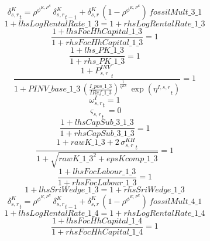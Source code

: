 \begin{dmath}
{{\delta^{K}_{s,r}}}_{t}={{\rho^{\phi^{K,P^E}}}}\, {{\delta^{K}_{s,r}}}_{t-1}+{{\delta^{K}_{s,r}}}\, \left(1-{{\rho^{\phi^{K,P^E}}}}\right)\, {fossilMult\_3\_1}
\end{dmath}
\begin{dmath}
1+{lhsLogRentalRate\_1\_3}=1+{rhsLogRentalRate\_1\_3}
\end{dmath}
\begin{dmath}
\frac{1+{lhsFocHhCapital\_1\_3}}{1+{rhsFocHhCapital\_1\_3}}=1
\end{dmath}
\begin{dmath}
\frac{1+{lhs\_PK\_1\_3}}{1+{rhs\_PK\_1\_3}}=1
\end{dmath}
\begin{dmath}
\frac{1+{{P^{INV}_{s,r}}}_{t}}{1+{PINV\_base\_1\_3}\, \left(\frac{{I\_pos\_1\_3}}{{IRef\_1\_3}}\right)^{\frac{1}{{{\eta^{KS}}}}}\, \exp\left({{\eta^{I,s,r}}}_{t}\right)}=1
\end{dmath}
\begin{dmath}
{{\omega^I_{s,r}}}_{t}=1
\end{dmath}
\begin{dmath}
{{\varsigma_{s,r}}}_{t}=0
\end{dmath}
\begin{dmath}
\frac{1+{lhsCapSub\_3\_1\_3}}{1+{rhsCapSub\_3\_1\_3}}=1
\end{dmath}
\begin{dmath}
\frac{1+{rawK\_1\_3}+2\, {{\sigma^{KH}_{s,r}}}_{t}}{1+\sqrt{{rawK\_1\_3}^{2}+{epsKcomp\_1\_3}}}=1
\end{dmath}
\begin{dmath}
\frac{1+{lhsFocLabour\_1\_3}}{1+{rhsFocLabour\_1\_3}}=1
\end{dmath}
\begin{dmath}
1+{lhsSriWedge\_1\_3}=1+{rhsSriWedge\_1\_3}
\end{dmath}
\begin{dmath}
{{\delta^{K}_{s,r}}}_{t}={{\rho^{\phi^{K,P^E}}}}\, {{\delta^{K}_{s,r}}}_{t-1}+{{\delta^{K}_{s,r}}}\, \left(1-{{\rho^{\phi^{K,P^E}}}}\right)\, {fossilMult\_4\_1}
\end{dmath}
\begin{dmath}
1+{lhsLogRentalRate\_1\_4}=1+{rhsLogRentalRate\_1\_4}
\end{dmath}
\begin{dmath}
\frac{1+{lhsFocHhCapital\_1\_4}}{1+{rhsFocHhCapital\_1\_4}}=1
\end{dmath}
